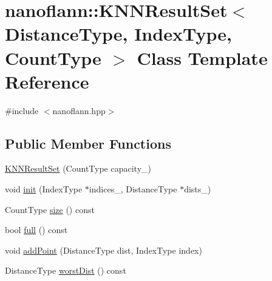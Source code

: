\hypertarget{classnanoflann_1_1_k_n_n_result_set}{\section{nanoflann\-:\-:K\-N\-N\-Result\-Set$<$ Distance\-Type, Index\-Type, Count\-Type $>$ Class Template Reference}
\label{classnanoflann_1_1_k_n_n_result_set}
}


{\ttfamily \#include $<$nanoflann.\-hpp$>$}

\subsection*{Public Member Functions}
\begin{DoxyCompactItemize}
\item 
\hyperlink{classnanoflann_1_1_k_n_n_result_set_aa6696a234675a151e367a473b9845286}{K\-N\-N\-Result\-Set} (Count\-Type capacity\-\_\-)
\item 
void \hyperlink{classnanoflann_1_1_k_n_n_result_set_a3e472126b7b71e3d0ab5c41995801f4d}{init} (Index\-Type $\ast$indices\-\_\-, Distance\-Type $\ast$dists\-\_\-)
\item 
Count\-Type \hyperlink{classnanoflann_1_1_k_n_n_result_set_a898f4cea82346d58c00aeb5981fecdd8}{size} () const 
\item 
bool \hyperlink{classnanoflann_1_1_k_n_n_result_set_af3e2dfe50472001d0b4dd372cecd74d7}{full} () const 
\item 
void \hyperlink{classnanoflann_1_1_k_n_n_result_set_a617bfcdec87d7d1fa28a0674c5a433df}{add\-Point} (Distance\-Type dist, Index\-Type index)
\item 
Distance\-Type \hyperlink{classnanoflann_1_1_k_n_n_result_set_aa29099bc2a68a9cf162796da072a2e50}{worst\-Dist} () const 
\end{DoxyCompactItemize}


